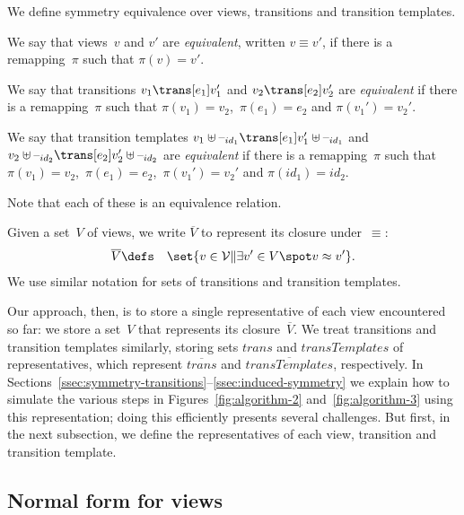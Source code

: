 
We define symmetry equivalence over views, transitions and transition
templates. 
%
\begin{definition}
We say that views~$v$ and $v'$ are \emph{equivalent}, written $v \equiv v'$,
if there is a remapping~$\pi$ such that $\pi(v) = v'$. 

We say that transitions $v_1 \trans[e_1] v_1'$ and $v_2 \trans[e_2] v_2'$ are
\emph{equivalent} if there is a remapping~$\pi$ such that $\pi(v_1) = v_2$,\,
$\pi(e_1) = e_2$ and $\pi(v_1') = v_2'$.

We say that transition templates $v_1 \uplus \hole{id_1} \trans[e_1] v_1'
\uplus \hole{id_1}$ and $v_2 \uplus \hole{id_2} \trans[e_2] v_2' \uplus
\hole{id_2}$ are \emph{equivalent} if there is a remapping~$\pi$ such that
$\pi(v_1) = v_2$,\, $\pi(e_1) = e_2$,\, $\pi(v_1') = v_2'$ and $\pi(id_1) = id_2$.

Note that each of these is an equivalence relation.

Given a set~$V$ of views, we write $\overline{V}$ to represent its closure
under~$\equiv$:
%
\begin{eqnarray*}
\overline{V} & \defs & \set{v \in \V \| \exists v' \in V \spot v \equiv v'}.
\end{eqnarray*}
%
We use similar notation for sets of transitions and transition templates.
\end{definition}


Our approach, then, is to store a single representative of each view
encountered so far: we store a set~$V$ that represents its
closure~$\overline{V}$.  We treat transitions and transition templates
similarly, storing sets $trans$ and $transTemplates$ of representatives, which
represent $\overline{trans}$ and $\overline{transTemplates}$, respectively.
%
In Sections~\ref{ssec:symmetry-transitions}--\ref{ssec:induced-symmetry} we
explain how to simulate the various steps in Figures~\ref{fig:algorithm-2}
and~\ref{fig:algorithm-3} using this representation; doing this efficiently
presents several challenges.
%
But first, in the next subsection, we define the representatives of each view,
transition and transition template.



\subsection{Normal form for views}

